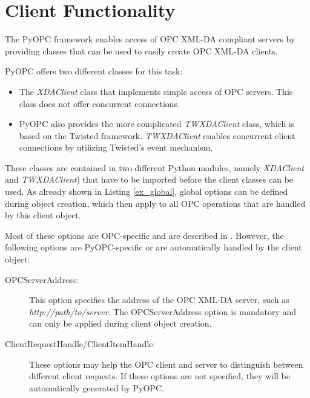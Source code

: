 
\section {Client Functionality}
\thispagestyle{plain}

The PyOPC framework enables access of OPC XML-DA compliant servers by
providing classes that can be used to easily create OPC XML-DA
clients.

PyOPC offers two different classes for this task:

\begin{itemize}
\item The {\sl XDAClient} class that implements simple access of OPC
servers. This class does not offer concurrent connections.

\item PyOPC also provides the more complicated {\sl TWXDAClient}
class, which is based on the Twisted framework. {\sl TWXDAClient}
enables concurrent client connections by utilizing Twisted's event
mechanism.
\end{itemize}

These classes are contained in two different Python modules, namely
{\sl XDAClient} and {\sl TWXDAClient}) that have to be imported before
the client classes can be used. As already shown in Listing
\ref{ex_global}, global options can be defined during object creation,
which then apply to all OPC operations that are handled by this client
object.

Most of these options are OPC-specific and are described in
\cite{OPCXMLDA}.  However, the following options are PyOPC-specific or are 
automatically handled by the client object:

\begin{description}
\item[OPCServerAddress:] This option specifies the address of the OPC
XML-DA server, such as {\sl http://path/to/server}. The
OPCServerAddress option is mandatory and can only be applied during
client object creation.

\item[ClientRequestHandle/ClientItemHandle:] These options may help
the OPC client and server to distinguish between different client
requests. If these options are not specified, they will be
automatically generated by PyOPC.
\end{description}


